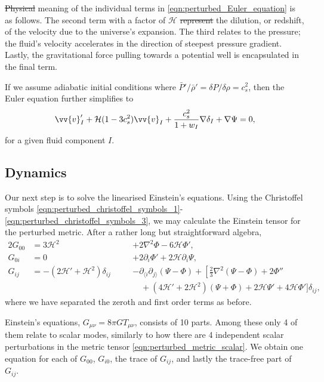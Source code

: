 \documentclass[a4paper,12pt,times,custombib,print,index]{Classes/PhDThesisPSnPDF} %
\providecommand{\DIFadd}[1]{{\protect\color{blue}\uwave{#1}}} %
\providecommand{\DIFdel}[1]{{\protect\color{red}\sout{#1}}}                      %
\providecommand{\DIFaddbegin}{} %
\providecommand{\DIFaddend}{} %
\providecommand{\DIFdelbegin}{} %
\providecommand{\DIFdelend}{} %
\newcommand{\DIFscaledelfig}{0.5}
\newlength{\DIFdelgraphicswidth} %
\newlength{\DIFdelgraphicsheight} %
\newcommand{\DIFaddincludegraphics}[2][]{{\color{blue}\fbox{\DIFOincludegraphics[#1]{#2}}}} %
\newcommand{\DIFdelincludegraphics}[2][]{%
\sbox{\DIFdelgraphicsbox}{\DIFOincludegraphics[#1]{#2}}%
\settoboxwidth{\DIFdelgraphicswidth}{\DIFdelgraphicsbox} %
\settoboxtotalheight{\DIFdelgraphicsheight}{\DIFdelgraphicsbox} %
\scalebox{\DIFscaledelfig}{%
\parbox[b]{\DIFdelgraphicswidth}{\usebox{\DIFdelgraphicsbox}\\[-\baselineskip] \rule{\DIFdelgraphicswidth}{0em}}\llap{\resizebox{\DIFdelgraphicswidth}{\DIFdelgraphicsheight}{%
\setlength{\unitlength}{\DIFdelgraphicswidth}%
\begin{picture}(1,1)%
\thicklines\linethickness{2pt} %
{\color[rgb]{1,0,0}\put(0,0){\framebox(1,1){}}}%
{\color[rgb]{1,0,0}\put(0,0){\line( 1,1){1}}}%
{\color[rgb]{1,0,0}\put(0,1){\line(1,-1){1}}}%
\end{picture}%
}\hspace*{3pt}}} %
} %
\DeclareRobustCommand{\DIFaddbegin}{\DIFOaddbegin \let\includegraphics\DIFaddincludegraphics} %
\DeclareRobustCommand{\DIFaddend}{\DIFOaddend \let\includegraphics\DIFOincludegraphics} %
\DeclareRobustCommand{\DIFdelbegin}{\DIFOdelbegin \let\includegraphics\DIFdelincludegraphics} %
\DeclareRobustCommand{\DIFdelend}{\DIFOaddend \let\includegraphics\DIFOincludegraphics} %
\begin{document}
\DIFdelbegin \DIFdel{Physical }\DIFdelend \DIFaddbegin \DIFadd{The physical }\DIFaddend meaning of the individual terms in \eqref{eqn:perturbed_Euler_equation} is as follows. The second term with a factor of $\mathcal{H}$ \DIFdelbegin \DIFdel{represent }\DIFdelend \DIFaddbegin \DIFadd{represents }\DIFaddend the dilution, or redshift, of the velocity due to the universe's expansion. The third relates to the pressure; the fluid's velocity accelerates in the direction of \DIFaddbegin \DIFadd{the }\DIFaddend steepest pressure gradient. Lastly, the gravitational force pulling towards a potential well is encapsulated in the final term.

If we assume adiabatic initial conditions where $\bar{P}'/\bar{\rho}' = \delta P / \delta \rho = c^2_s$, then the Euler equation further simplifies to
\begin{align}
	\vv{v}'_I + \mathcal{H} (1 - 3c^2_s) \vv{v}_I + \frac{c^2_s}{1+w_I} \nabla\delta_I + \nabla\Psi = 0,
\end{align}
for a given fluid component $I$.


\subsection{Dynamics}

Our next step is to solve the linearised Einstein's equations. Using the Christoffel symbols \eqref{eqn:perturbed_christoffel_symbols_1}-\eqref{eqn:perturbed_christoffel_symbols_3}, we may calculate the Einstein tensor for the perturbed metric. After a rather long but straightforward algebra,
\begin{alignat}{2}
	G_{00} &= 3\mathcal{H}^2 \quad&&+ 2\nabla^2 \Phi - 6 \mathcal{H} \Phi', \label{eqn:perturbed_einstein_tensor_1}\\
	G_{0i} &= 0 \quad&&+ 2\partial_i \Phi' + 2 \mathcal{H} \partial_i \Psi, \label{eqn:perturbed_einstein_tensor_2}\\
	G_{ij} &= -(2\mathcal{H}' + \mathcal{H}^2) \delta_{ij} \quad&&- \partial_{\langle i} \partial_{j \rangle} (\Psi - \Phi) + \left[ \frac{2}{3}\nabla^2 (\Psi-\Phi) + 2\Phi'' \right. \nonumber\\
	& &&\quad + (4\mathcal{H}' + 2\mathcal{H}^2)(\Psi+\Phi) + 2\mathcal{H}\Psi' + 4\mathcal{H}\Phi' \biggr] \delta_{ij}, \label{eqn:perturbed_einstein_tensor_3}
\end{alignat}
where we have separated the zeroth and first order terms as before.

Einstein's equations, $G_{\mu\nu} = 8\pi G T_{\mu\nu}$, consists of 10 parts. Among these only 4 of them relate to scalar modes, similarly to how there are 4 independent scalar perturbations in the metric tensor \eqref{eqn:perturbed_metric_scalar}. We obtain one equation for each of $G_{00}$, $G_{i0}$, the trace of $G_{ij}$, and lastly the trace-free part of $G_{ij}$.
\end{document}
